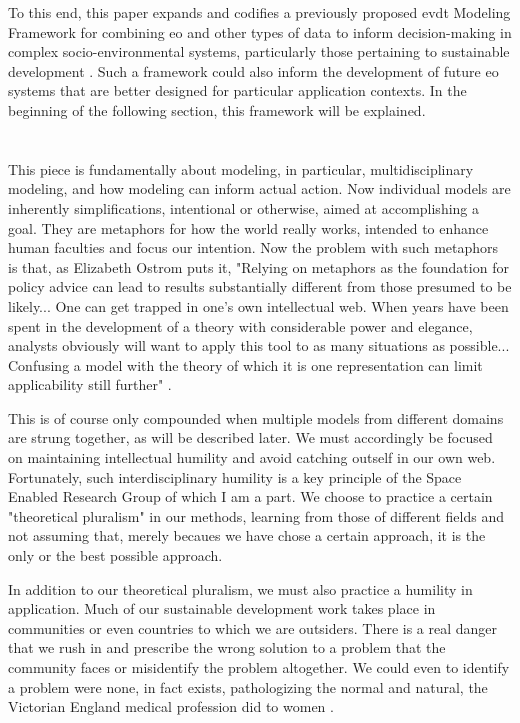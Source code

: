 To this end, this paper expands and codifies a previously proposed \ac{evdt} Modeling Framework  for combining \ac{eo} and other types of data to inform decision-making in complex socio-environmental systems, particularly those pertaining to sustainable development \cite{reidCombiningSocialEnvironmental2019}. Such a framework could also inform the development of future \ac{eo} systems that are better designed for particular application contexts. In the beginning of the following section, this framework will be explained. 

\section{}

This piece is fundamentally about modeling, in particular, multidisciplinary modeling, and how modeling can inform actual action. Now individual models are inherently simplifications, intentional or otherwise, aimed at accomplishing a goal. They are metaphors for how the world really works, intended to enhance human faculties and focus our intention. Now the problem with such metaphors is that, as Elizabeth Ostrom puts it, "Relying on metaphors as the foundation for policy advice can lead to results substantially different from those presumed to be likely... One can get trapped in one's own intellectual web. When years have been spent in the development of a theory with considerable power and elegance, analysts obviously will want to apply this tool to as many situations as possible... Confusing a model with the theory of which it is one representation can limit applicability still further" \cite{ostromGoverningCommonsEvolution2015}. 

This is of course only compounded when multiple models from different domains are strung together, as will be described later. We must accordingly be focused on maintaining intellectual humility and avoid catching outself in our own web. Fortunately, such interdisciplinary humility is a key principle of the Space Enabled Research Group of which I am a part. We choose to practice a certain "theoretical pluralism" \cite{turkleEmpathyDiariesMemoir2021} in our methods, learning from those of different fields and not assuming that, merely becaues we have chose a certain approach, it is the only or the best possible approach.

In addition to our theoretical pluralism, we must also practice a humility in application. Much of our sustainable development work takes place in communities or even countries to which we are outsiders. There is a real danger that we rush in and prescribe the wrong solution to a problem that the community faces or misidentify the problem altogether. We could even to identify a problem were none, in fact exists, pathologizing the normal and natural, the Victorian England medical profession did to women \cite{duffinConspicuousConsumptiveWoman2012}. 

